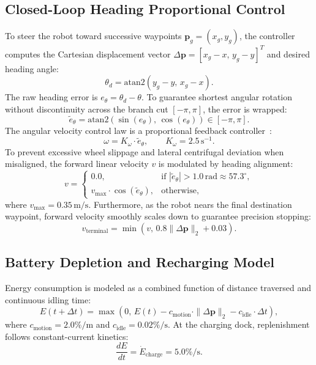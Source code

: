 \documentclass[12pt,a4paper]{article}
\begin{document}
\subsection{Closed-Loop Heading Proportional Control}
To steer the robot toward successive waypoints $\mathbf{p}_g = (x_g, y_g)$, the controller computes the Cartesian displacement vector $\Delta \mathbf{p} = [x_g - x, \, y_g - y]^T$ and desired heading angle:
\begin{equation}
\theta_d = \text{atan2}(y_g - y, \, x_g - x).
\end{equation}
The raw heading error is $e_\theta = \theta_d - \theta$. To guarantee shortest angular rotation without discontinuity across the branch cut $[-\pi, \pi]$, the error is wrapped:
\begin{equation}
\tilde{e}_\theta = \text{atan2}(\sin(e_\theta), \, \cos(e_\theta)) \in [-\pi, \pi].
\end{equation}
The angular velocity control law is a proportional feedback controller~\cite{astrom2008}:
\begin{equation}
\omega = K_\omega \cdot \tilde{e}_\theta, \qquad K_\omega = 2.5\,\text{s}^{-1}.
\end{equation}
To prevent excessive wheel slippage and lateral centrifugal deviation when misaligned, the forward linear velocity $v$ is modulated by heading alignment:
\begin{equation}
v = \begin{cases}
0.0, & \text{if } |\tilde{e}_\theta| > 1.0\,\text{rad} \approx 57.3^\circ, \\
v_{\max} \cdot \cos(\tilde{e}_\theta), & \text{otherwise},
\end{cases}
\end{equation}
where $v_{\max} = 0.35\,\text{m/s}$. Furthermore, as the robot nears the final destination waypoint, forward velocity smoothly scales down to guarantee precision stopping:
\begin{equation}
v_{\text{terminal}} = \min(v, \, 0.8 \|\Delta \mathbf{p}\|_2 + 0.03).
\end{equation}

\subsection{Battery Depletion and Recharging Model}
Energy consumption is modeled as a combined function of distance traversed and continuous idling time:
\begin{equation}
E(t + \Delta t) = \max\left(0, \, E(t) - c_{\text{motion}} \cdot \|\Delta \mathbf{p}\|_2 - c_{\text{idle}} \cdot \Delta t \right),
\end{equation}
where $c_{\text{motion}} = 2.0\%/\text{m}$ and $c_{\text{idle}} = 0.02\%/\text{s}$. At the charging dock, replenishment follows constant-current kinetics:
\begin{equation}
\frac{dE}{dt} = \dot{E}_{\text{charge}} = 5.0\%/\text{s}.
\end{equation}
\end{document}
